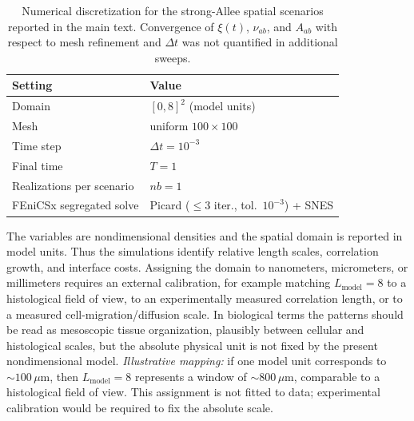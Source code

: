 \begin{table}[!htbp]
\centering
\caption{Numerical discretization for the strong-Allee spatial scenarios reported in the main text. Convergence of $\xi(t)$, $\nu_{ab}$, and $A_{ab}$ with respect to mesh refinement and $\Delta t$ was not quantified in additional sweeps.}
\label{tab:discretization}
\begin{tabular}{ll}
\toprule
Setting & Value \\
\midrule
Domain & $[0,8]^2$ (model units) \\
Mesh & uniform $100\times100$ \\
Time step & $\Delta t=10^{-3}$ \\
Final time & $T=1$ \\
Realizations per scenario & $nb=1$ \\
FEniCSx segregated solve & Picard ($\leq 3$ iter., tol.\ $10^{-3}$) + SNES \\
\bottomrule
\end{tabular}
\end{table}

The variables are nondimensional densities and the spatial domain is reported in model units. Thus the simulations identify relative length scales, correlation growth, and interface costs. Assigning the domain to nanometers, micrometers, or millimeters requires an external calibration, for example matching $L_{\mathrm{model}}=8$ to a histological field of view, to an experimentally measured correlation length, or to a measured cell-migration/diffusion scale. In biological terms the patterns should be read as mesoscopic tissue organization, plausibly between cellular and histological scales, but the absolute physical unit is not fixed by the present nondimensional model. \emph{Illustrative mapping:} if one model unit corresponds to $\sim100\,\mu\mathrm{m}$, then $L_{\mathrm{model}}=8$ represents a window of $\sim800\,\mu\mathrm{m}$, comparable to a histological field of view. This assignment is not fitted to data; experimental calibration would be required to fix the absolute scale.

